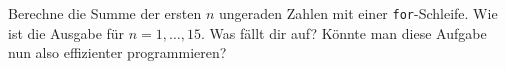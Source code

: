 \begin{aufg}
Berechne die Summe der ersten $n$ ungeraden Zahlen mit einer \texttt{for}-Schleife. Wie ist die Ausgabe für $n = 1, \ldots ,15$. Was fällt dir auf? Könnte man diese Aufgabe nun also effizienter programmieren?
\end{aufg}
